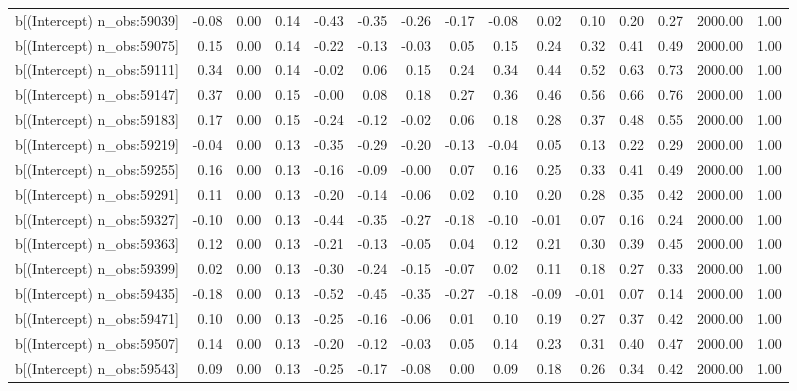 \begin{table}[ht]
\begin{tabular}{rrrrrrrrrrrrrrr}
  b[(Intercept) n\_obs:59039] & -0.08 & 0.00 & 0.14 & -0.43 & -0.35 & -0.26 & -0.17 & -0.08 & 0.02 & 0.10 & 0.20 & 0.27 & 2000.00 & 1.00 \\ 
  b[(Intercept) n\_obs:59075] & 0.15 & 0.00 & 0.14 & -0.22 & -0.13 & -0.03 & 0.05 & 0.15 & 0.24 & 0.32 & 0.41 & 0.49 & 2000.00 & 1.00 \\ 
  b[(Intercept) n\_obs:59111] & 0.34 & 0.00 & 0.14 & -0.02 & 0.06 & 0.15 & 0.24 & 0.34 & 0.44 & 0.52 & 0.63 & 0.73 & 2000.00 & 1.00 \\ 
  b[(Intercept) n\_obs:59147] & 0.37 & 0.00 & 0.15 & -0.00 & 0.08 & 0.18 & 0.27 & 0.36 & 0.46 & 0.56 & 0.66 & 0.76 & 2000.00 & 1.00 \\ 
  b[(Intercept) n\_obs:59183] & 0.17 & 0.00 & 0.15 & -0.24 & -0.12 & -0.02 & 0.06 & 0.18 & 0.28 & 0.37 & 0.48 & 0.55 & 2000.00 & 1.00 \\ 
  b[(Intercept) n\_obs:59219] & -0.04 & 0.00 & 0.13 & -0.35 & -0.29 & -0.20 & -0.13 & -0.04 & 0.05 & 0.13 & 0.22 & 0.29 & 2000.00 & 1.00 \\ 
  b[(Intercept) n\_obs:59255] & 0.16 & 0.00 & 0.13 & -0.16 & -0.09 & -0.00 & 0.07 & 0.16 & 0.25 & 0.33 & 0.41 & 0.49 & 2000.00 & 1.00 \\ 
  b[(Intercept) n\_obs:59291] & 0.11 & 0.00 & 0.13 & -0.20 & -0.14 & -0.06 & 0.02 & 0.10 & 0.20 & 0.28 & 0.35 & 0.42 & 2000.00 & 1.00 \\ 
  b[(Intercept) n\_obs:59327] & -0.10 & 0.00 & 0.13 & -0.44 & -0.35 & -0.27 & -0.18 & -0.10 & -0.01 & 0.07 & 0.16 & 0.24 & 2000.00 & 1.00 \\ 
  b[(Intercept) n\_obs:59363] & 0.12 & 0.00 & 0.13 & -0.21 & -0.13 & -0.05 & 0.04 & 0.12 & 0.21 & 0.30 & 0.39 & 0.45 & 2000.00 & 1.00 \\ 
  b[(Intercept) n\_obs:59399] & 0.02 & 0.00 & 0.13 & -0.30 & -0.24 & -0.15 & -0.07 & 0.02 & 0.11 & 0.18 & 0.27 & 0.33 & 2000.00 & 1.00 \\ 
  b[(Intercept) n\_obs:59435] & -0.18 & 0.00 & 0.13 & -0.52 & -0.45 & -0.35 & -0.27 & -0.18 & -0.09 & -0.01 & 0.07 & 0.14 & 2000.00 & 1.00 \\ 
  b[(Intercept) n\_obs:59471] & 0.10 & 0.00 & 0.13 & -0.25 & -0.16 & -0.06 & 0.01 & 0.10 & 0.19 & 0.27 & 0.37 & 0.42 & 2000.00 & 1.00 \\ 
  b[(Intercept) n\_obs:59507] & 0.14 & 0.00 & 0.13 & -0.20 & -0.12 & -0.03 & 0.05 & 0.14 & 0.23 & 0.31 & 0.40 & 0.47 & 2000.00 & 1.00 \\ 
  b[(Intercept) n\_obs:59543] & 0.09 & 0.00 & 0.13 & -0.25 & -0.17 & -0.08 & 0.00 & 0.09 & 0.18 & 0.26 & 0.34 & 0.42 & 2000.00 & 1.00 \\ 

\end{tabular}
\end{table}
